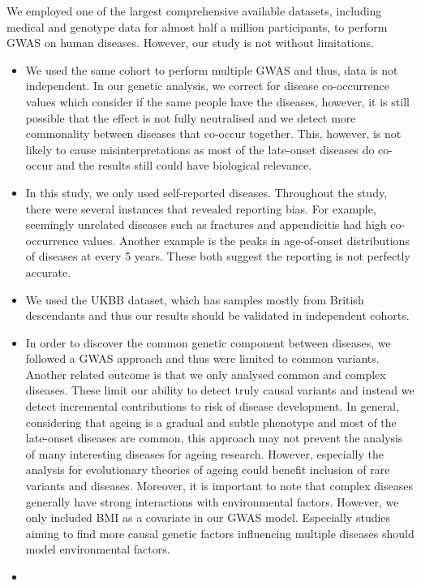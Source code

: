 \documentclass[12pt,twoside]{unicam}
\providecommand{\tightlist}{%
  \setlength{\itemsep}{0pt}\setlength{\parskip}{0pt}}
\begin{document}
We employed one of the largest comprehensive available datasets, including medical and genotype data for almost half a million participants, to perform GWAS on human diseases. However, our study is not without limitations.

\begin{itemize}
\tightlist
\item
  We used the same cohort to perform multiple GWAS and thus, data is not independent. In our genetic analysis, we correct for disease co-occurrence values which consider if the same people have the diseases, however, it is still possible that the effect is not fully neutralised and we detect more commonality between diseases that co-occur together. This, however, is not likely to cause misinterpretations as most of the late-onset diseases do co-occur and the results still could have biological relevance.
\item
  In this study, we only used self-reported diseases. Throughout the study, there were several instances that revealed reporting bias. For example, seemingly unrelated diseases such as fractures and appendicitis had high co-occurrence values. Another example is the peaks in age-of-onset distributions of diseases at every 5 years. These both suggest the reporting is not perfectly accurate.
\item
  We used the UKBB dataset, which has samples mostly from British descendants and thus our results should be validated in independent cohorts.
\item
  In order to discover the common genetic component between diseases, we followed a GWAS approach and thus were limited to common variants. Another related outcome is that we only analysed common and complex diseases. These limit our ability to detect truly causal variants and instead we detect incremental contributions to risk of disease development. In general, considering that ageing is a gradual and subtle phenotype and most of the late-onset diseases are common, this approach may not prevent the analysis of many interesting diseases for ageing research. However, especially the analysis for evolutionary theories of ageing could benefit inclusion of rare variants and diseases. Moreover, it is important to note that complex diseases generally have strong interactions with environmental factors. However, we only included BMI as a covariate in our GWAS model. Especially studies aiming to find more causal genetic factors influencing multiple diseases should model environmental factors.
\item

\end{itemize}
\end{document}
